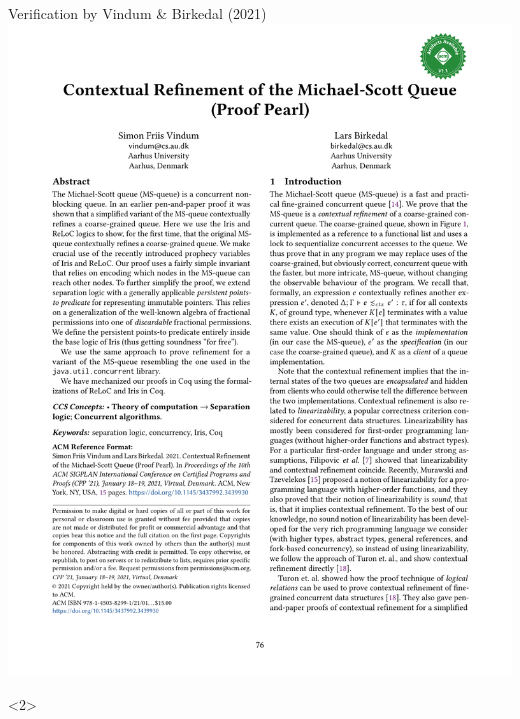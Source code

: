 
\begin{frame}{Verification by Vindum \& Birkedal (2021)}
\centering
\includegraphics[scale=0.5]{images/vindum_birkedal_2021.pdf}
\begin{overbox}<2>

\end{overbox}
\end{frame}
